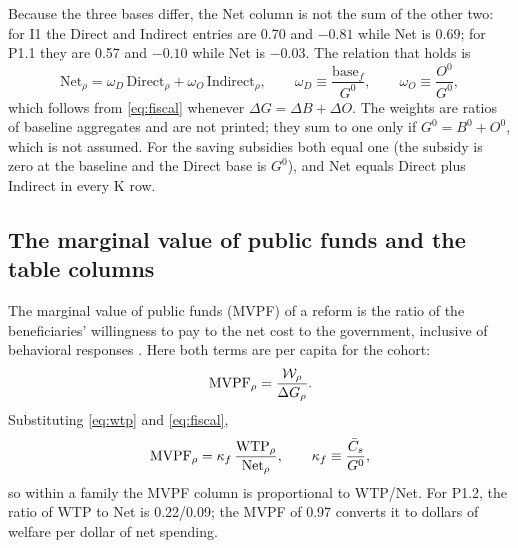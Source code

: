 Because the three bases differ, the Net column is not the sum of the other two: for I1 the Direct and Indirect entries are 0.70 and $-0.81$ while Net is 0.69; for P1.1 they are 0.57 and $-0.10$ while Net is $-0.03$.
The relation that holds is
\begin{equation}\label{eq:netidentity}
\text{Net}_{\rho}=\omega_{D}\,\text{Direct}_{\rho}+\omega_{O}\,\text{Indirect}_{\rho},
\qquad
\omega_{D}\equiv\frac{\text{base}_f}{G^{0}},
\qquad
\omega_{O}\equiv\frac{O^{0}}{G^{0}},
\end{equation}
which follows from \eqref{eq:fiscal} whenever $\Delta G=\Delta B+\Delta O$. The weights are ratios of baseline aggregates and are not printed; they sum to one only if $G^{0}=B^{0}+O^{0}$, which is not assumed. For the saving subsidies both equal one (the subsidy is zero at the baseline and the Direct base is $G^{0}$), and Net equals Direct plus Indirect in every K row.



\subsection{The marginal value of public funds and the table columns}\label{sec:mvpf}

The marginal value of public funds (MVPF) of a reform is the ratio of the beneficiaries' willingness to pay to the net cost to the government, inclusive of behavioral responses \citep{hendren2016policy,hendren2020unified,finkelstein2020welfare}. Here both terms are per capita for the cohort:
\begin{equation}\label{eq:mvpf}
\operatorname{MVPF}_{\rho}=\frac{\mathcal{W}_{\rho}}{\Delta G_{\rho}}.
\end{equation}
Substituting \eqref{eq:wtp} and \eqref{eq:fiscal},
\begin{equation}\label{eq:mvpfcolumns}
\operatorname{MVPF}_{\rho}=\kappa_f\,\frac{\operatorname{WTP}_{\rho}}{\text{Net}_{\rho}},
\qquad
\kappa_f\equiv\frac{\bar{C}_{s}}{G^{0}},
\end{equation}
so within a family the MVPF column is proportional to WTP/Net. For P1.2, the ratio of WTP to Net is 0.22/0.09; the MVPF of 0.97 converts it to dollars of welfare per dollar of net spending.

